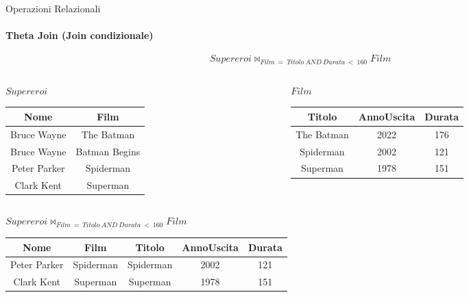     \begin{frame}{Operazioni Relazionali}
        \framesubtitle{Theta Join (Join condizionale)}
        \vspace{-1.2cm}
        \[ Supereroi \bowtie_{Film~=~Titolo~AND~Durata~<~160} Film\]
        \vspace{-.5cm}
        \begin{columns}
            \begin{column}{0.48\textwidth}
                \centering
                {\small $Supereroi$}
                \newline
        \begin{tabular}{|c|c|}
            \hline
            \rowcolor{cyan!30}Nome & Film \\
            \hline
            Bruce Wayne & The Batman \\ \hline
            Bruce Wayne & Batman Begins \\ \hline
            Peter Parker & Spiderman \\ \hline
            Clark Kent & Superman\\ \hline
            \end{tabular}
            \end{column}
            \begin{column}{0.48\textwidth}
                \centering
                {\small $Film$}
                \newline
                \begin{tabular}{|c|c|c|}
                    \hline
                    \rowcolor{cyan!30} Titolo & AnnoUscita & Durata \\ \hline
                    The Batman & 2022 & 176 \\ \hline
                    Spiderman & 2002 & 121 \\ \hline
                    Superman & 1978 & 151 \\ \hline
                    \end{tabular}
            \end{column}
        \end{columns}
        \vspace{.5cm}
        \centering
        \pause
        {\small $Supereroi \bowtie_{Film~=~Titolo~AND~Durata~<~160} Film$
        \begin{tabular}{|c|c|c|c|c|}
            \hline
            \rowcolor{cyan!30} Nome & Film & Titolo & AnnoUscita & Durata\\ \hline
            Peter Parker & Spiderman & Spiderman & 2002 & 121 \\ \hline
            Clark Kent & Superman & Superman & 1978 & 151\\ \hline
            \end{tabular}}
    \end{frame}
